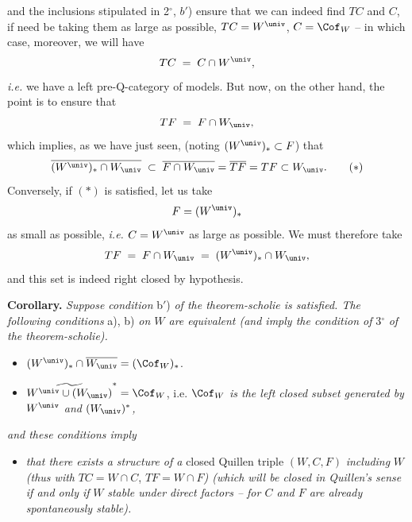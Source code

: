 
\noindent and the inclusions stipulated in 2$^\circ$, $b'$) ensure that we can indeed find $TC$ and $C$, if need be taking them as large as possible, $TC = W^{\univ}$, $C = \Cof_W$ -- in which case, moreover, we will have
\[
TC \;=\; C \cap W^{\univ},
\]
\textit{i.e.} we have a left pre-Q-category of models. But now, on the other hand, the point is to ensure that
\[
TF \;=\; F \cap W_{\univ},
\]
which implies, as we have just seen, (noting $(W^{\univ})_* \subset F$) that
\[
\overline{(W^{\univ})_* \cap W_{\univ}} \;\subset\; \overline{F \cap W_{\univ}} = \overline{TF} = TF \subset W_{\univ}. \tag*{$(*)$}
\]
Conversely, if $(*)$ is satisfied, let us take
\[
F = (W^{\univ})_*
\]
as small as possible, \textit{i.e.} $C = W^{\univ}$ as large as possible. We must therefore take
\[
TF \;=\; F \cap W_{\univ} \;=\; (W^{\univ})_* \cap W_{\univ},
\]
and this set is indeed right closed by hypothesis.

\textbf{Corollary.} \textit{Suppose condition} b$'$) \textit{of the theorem-scholie is satisfied. The following conditions} a), b) \textit{on $W$ are equivalent (and imply the condition of} 3$^\circ$ \textit{of the theorem-scholie).}

\begin{itemize}[leftmargin=3em]
\item[\cercle{a}] $(W^{\univ})_* \cap \overline{W_{\univ}} = (\Cof_W)_*$.

\item[\cercle{b}] $\widetilde{W^{\univ} \cup (W_{\univ})}^{*} = \Cof_W$, i.e. $\Cof_W$ \textit{is the left closed subset generated by} $W^{\univ}$ \textit{and} $(W_{\univ})^*$\textit{,} %
\end{itemize}

\noindent\textit{and these conditions imply}

\begin{itemize}[leftmargin=3em]
\item[\cercle{c}] \textit{that there exists a structure of a} closed Quillen triple $(W, C, F)$ \textit{including} $W$ \textit{(thus with} $TC = W \cap C$, $TF = W \cap F$\textit{) (which will be closed in Quillen's sense if and only if} $W$ \textit{stable under direct factors -- for $C$ and $F$ are already spontaneously stable).}
\end{itemize}

